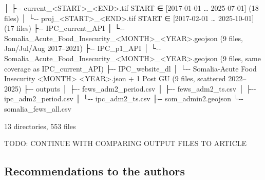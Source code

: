 \documentclass[
  a4paper,
]{article}
\newenvironment{Shaded}{\begin{snugshade}}{\end{snugshade}}
\newcommand{\NormalTok}[1]{#1}
\begin{document}
\begin{Shaded}
\begin{Highlighting}[]
\NormalTok{│       ├{-}{-} current\_\textless{}START\textgreater{}\_\textless{}END\textgreater{}.tif  START ∈ [2017{-}01{-}01 … 2025{-}07{-}01]   (18 files)}
\NormalTok{│       └{-}{-} proj\_\textless{}START\textgreater{}\_\textless{}END\textgreater{}.tif     START ∈ [2017{-}02{-}01 … 2025{-}10{-}01]   (17 files)}
\NormalTok{├{-}{-} IPC\_current\_API}
\NormalTok{│   └{-}{-} Somalia\_Acute\_Food\_Insecurity\_\textless{}MONTH\textgreater{}\_\textless{}YEAR\textgreater{}.geojson           (9 files, Jan/Jul/Aug 2017–2021)}
\NormalTok{├{-}{-} IPC\_p1\_API}
\NormalTok{│   └{-}{-} Somalia\_Acute\_Food\_Insecurity\_\textless{}MONTH\textgreater{}\_\textless{}YEAR\textgreater{}.geojson           (9 files, same coverage as IPC\_current\_API)}
\NormalTok{├{-}{-} IPC\_website\_dl}
\NormalTok{│   └{-}{-} Somalia{-}Acute Food Insecurity \textless{}MONTH\textgreater{} \textless{}YEAR\textgreater{}.json + 1 Post GU  (9 files, scattered 2022–2025)}
\NormalTok{├{-}{-} outputs}
\NormalTok{│   ├{-}{-} fews\_adm2\_period.csv}
\NormalTok{│   ├{-}{-} fews\_adm2\_ts.csv}
\NormalTok{│   ├{-}{-} ipc\_adm2\_period.csv}
\NormalTok{│   └{-}{-} ipc\_adm2\_ts.csv}
\NormalTok{├{-}{-} som\_admin2.geojson}
\NormalTok{└{-}{-} somalia\_fews\_all.csv}

\NormalTok{13 directories, 553 files}
\end{Highlighting}
\end{Shaded}

\normalsize

TODO: CONTINUE WITH COMPARING OUTPUT FILES TO ARTICLE

\subsection{Recommendations to the
authors}\label{recommendations-to-the-authors}
\end{document}

